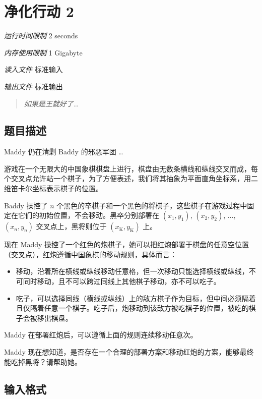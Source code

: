 \section[K. 净化行动 2]{ 净化行动 2}

\textit{运行时间限制}   2 seconds

\textit{内存使用限制} 1 Gigabyte

\textit{读入文件} \qquad 标准输入

\textit{输出文件} \qquad 标准输出

\begin{quote}
   \textit{如果是王就好了\ldots}
\end{quote}


\subsection{题目描述}

Maddy 仍在清剿 Baddy 的邪恶军团 \ldots

游戏在一个无限大的中国象棋棋盘上进行，棋盘由无数条横线和纵线交叉而成，每个交叉点允许站一个棋子，为了方便表述，我们将其抽象为平面直角坐标系，用二维笛卡尔坐标表示棋子的位置。

Baddy 操控了 $n$ 个黑色的卒棋子和一个黑色的将棋子，这些棋子在游戏过程中固定在它们的初始位置，不会移动。黑卒分别部署在 $(x_1, y_1)$, $(x_2, y_2)$, $\ldots$, $(x_n, y_n)$ 交叉点上，黑将则位于 $(x_\text{K}, y_\text{K})$ 上。

现在 Maddy 操控了一个红色的炮棋子，她可以把红炮部署于棋盘的任意空位置（交叉点），红炮遵循中国象棋的移动规则，具体而言：

\begin{itemize}
   \item 移动，沿着所在横线或纵线移动任意格，但一次移动只能选择横线或纵线，不可同时移动，且不可以跨过同线上其他棋子移动，亦不可以吃子。
   \item 吃子，可以选择同线（横线或纵线）上的敌方棋子作为目标，但中间必须隔着且仅隔着任意一个棋子。吃子后，炮移动到该敌方被吃棋子的位置，被吃的棋子会被移出棋盘。
\end{itemize}

Maddy 在部署红炮后，可以遵循上面的规则连续移动任意次。

Maddy 现在想知道，是否存在一个合理的部署方案和移动红炮的方案，能够最终能吃掉黑将？请帮助她。

\subsection{输入格式}

